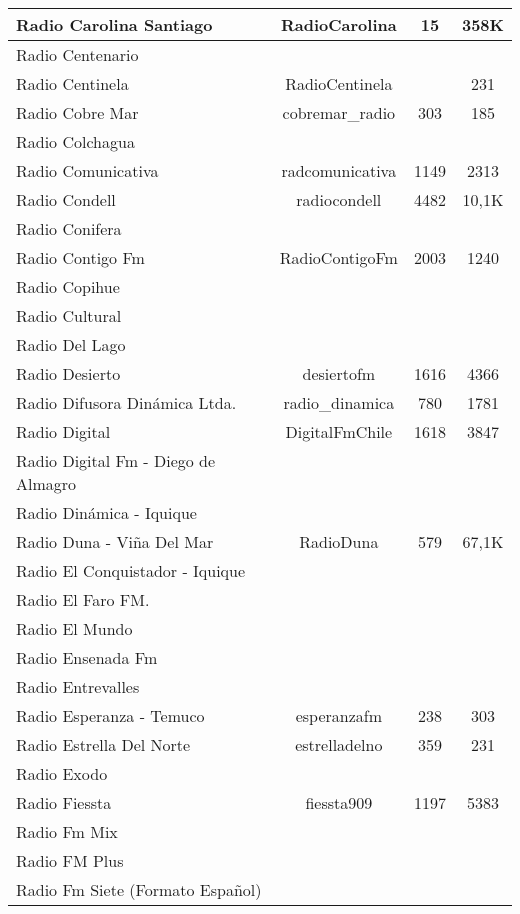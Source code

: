 \begin{center}
\begin{longtable}{| l | c | c | c |}
Radio Carolina Santiago	&	RadioCarolina	&	15	&	358K	\\ \hline
Radio Centenario	&		&		&		\\ \hline
Radio Centinela	&	RadioCentinela	&		&	231	\\ \hline
Radio Cobre Mar	&	cobremar\_radio	&	303	&	185	\\ \hline
Radio Colchagua	&		&		&		\\ \hline
Radio Comunicativa	&	radcomunicativa	&	1149	&	2313	\\ \hline
Radio Condell	&	radiocondell	&	4482	&	10,1K	\\ \hline
Radio Conifera	&		&		&		\\ \hline
Radio Contigo Fm	&	RadioContigoFm	&	2003	&	1240	\\ \hline
Radio Copihue	&		&		&		\\ \hline
Radio Cultural	&		&		&		\\ \hline
Radio Del Lago	&		&		&		\\ \hline
Radio Desierto	&	desiertofm	&	1616	&	4366	\\ \hline
Radio Difusora Dinámica Ltda.	&	radio\_dinamica	&	780	&	1781	\\ \hline
Radio Digital	&	DigitalFmChile	&	1618	&	3847	\\ \hline
Radio Digital Fm - Diego de Almagro	&		&		&		\\ \hline
Radio Dinámica - Iquique	&		&		&		\\ \hline
Radio Duna - Viña Del Mar	&	RadioDuna	&	579	&	67,1K	\\ \hline
Radio El Conquistador - Iquique	&		&		&		\\ \hline
Radio El Faro FM.	&		&		&		\\ \hline
Radio El Mundo	&		&		&		\\ \hline
Radio Ensenada Fm	&		&		&		\\ \hline
Radio Entrevalles	&		&		&		\\ \hline
Radio Esperanza - Temuco	&	esperanzafm	&	238	&	303	\\ \hline
Radio Estrella Del Norte	&	estrelladelno	&	359	&	231	\\ \hline
Radio Exodo	&		&		&		\\ \hline
Radio Fiessta	&	fiessta909	&	1197	&	5383	\\ \hline
Radio Fm Mix	&		&		&		\\ \hline
Radio FM Plus	&		&		&		\\ \hline
Radio Fm Siete (Formato Español)	&		&		&		\\ \hline

\end{longtable}
\end{center}
